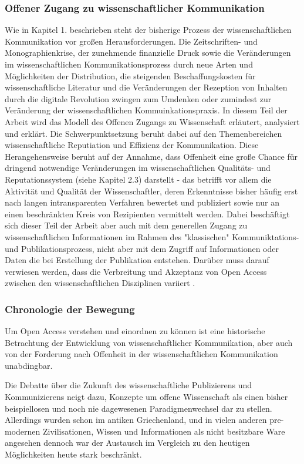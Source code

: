 
\subsubsection{Offener Zugang zu wissenschaftlicher Kommunikation}

Wie in Kapitel 1. beschrieben steht der bisherige Prozess der wissenschaftlichen Kommunikation vor großen Herausforderungen. Die Zeitschriften- und Monographienkrise, der zunehmende finanzielle Druck sowie die Veränderungen im wissenschaftlichen Kommunikationsprozess durch neue Arten und Möglichkeiten der Distribution, die steigenden Beschaffungskosten für wissenschaftliche Literatur\cite{cite:17} und die Veränderungen der Rezeption von Inhalten durch die digitale Revolution zwingen zum Umdenken oder zumindest zur Veränderung der wissenschaftlichen Kommuinkationspraxis. In diesem Teil der Arbeit wird das Modell des Offenen Zugangs zu Wissenschaft erläutert, analysiert und erklärt.
Die Schwerpunktsetzung beruht dabei auf den Themenbereichen wissenschaftliche Reputiation und Effizienz der Kommunikation. Diese Herangehensweise beruht auf der Annahme, dass Offenheit eine große Chance für dringend notwendige Veränderungen im wissenschaftlichen Qualitäts- und Reputationssystem (siehe Kapitel 2.3) darstellt - das betrifft vor allem die Aktivität und Qualität der Wissenschaftler, deren Erkenntnisse bisher häufig erst nach langen intransparenten Verfahren bewertet und publiziert sowie nur an einen beschränkten Kreis von Rezipienten vermittelt werden. Dabei beschäftigt sich dieser Teil der Arbeit aber auch mit dem generellen Zugang zu wissenschaftlichen Informationen im Rahmen des "klassischen" Kommuniktations- und Publikationsprozess, nicht aber mit dem Zugriff auf Informationen oder Daten die bei Erstellung der Publikation entstehen. Darüber muss darauf verwiesen werden, dass die Verbreitung und Akzeptanz von Open Access zwischen den wissenschaftlichen Disziplinen variiert\cite{cite:21a} .

\subsubsection{Chronologie der Bewegung}

Um Open Access verstehen und einordnen zu können ist eine historische Betrachtung der Entwicklung von wissenschaftlicher Kommunikation, aber auch von der Forderung nach Offenheit in der wissenschaftlichen Kommunikation unabdingbar. 

Die Debatte über die Zukunft des wissenschaftliche Publizierens und Kommunizierens neigt dazu, Konzepte um offene Wissenschaft als einen bisher beispiellosen und noch nie dagewesenen Paradigmenwechsel dar zu stellen\cite{cite:17a}\cite{cite:17b}. Allerdings wurden schon im antiken Griechenland, und in vielen anderen pre-modernen Zivilisationen, Wissen und Informationen als nicht besitzbare Ware angesehen\cite{cite:18} dennoch war der Austausch im Vergleich zu den heutigen Möglichkeiten heute stark beschränkt\cite{cite:17c}.

